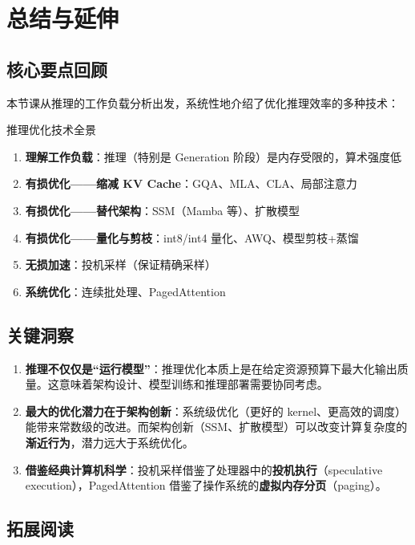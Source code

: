 \section{总结与延伸}

\subsection{核心要点回顾}

本节课从推理的工作负载分析出发，系统性地介绍了优化推理效率的多种技术：

\begin{importantbox}{推理优化技术全景}
\begin{enumerate}
    \item \textbf{理解工作负载}：推理（特别是 Generation 阶段）是内存受限的，算术强度低
    \item \textbf{有损优化——缩减 KV Cache}：GQA、MLA、CLA、局部注意力
    \item \textbf{有损优化——替代架构}：SSM（Mamba 等）、扩散模型
    \item \textbf{有损优化——量化与剪枝}：int8/int4 量化、AWQ、模型剪枝+蒸馏
    \item \textbf{无损加速}：投机采样（保证精确采样）
    \item \textbf{系统优化}：连续批处理、PagedAttention
\end{enumerate}
\end{importantbox}

\subsection{关键洞察}

\begin{enumerate}
    \item \textbf{推理不仅仅是``运行模型''}：推理优化本质上是在给定资源预算下最大化输出质量。这意味着架构设计、模型训练和推理部署需要协同考虑。

    \item \textbf{最大的优化潜力在于架构创新}：系统级优化（更好的 kernel、更高效的调度）能带来常数级的改进。而架构创新（SSM、扩散模型）可以改变计算复杂度的\textbf{渐近行为}，潜力远大于系统优化。

    \item \textbf{借鉴经典计算机科学}：投机采样借鉴了处理器中的\textbf{投机执行}（speculative execution），PagedAttention 借鉴了操作系统的\textbf{虚拟内存分页}（paging）。
\end{enumerate}

\subsection{拓展阅读}

